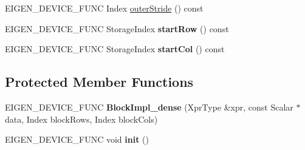 \begin{DoxyCompactItemize}
\item 
E\+I\+G\+E\+N\+\_\+\+D\+E\+V\+I\+C\+E\+\_\+\+F\+U\+NC Index \mbox{\hyperlink{class_eigen_1_1internal_1_1_block_impl__dense_3_01_xpr_type_00_01_block_rows_00_01_block_cols_00_01_inner_panel_00_01true_01_4_ac6f37b9a06897f0891fcd7b65ce2800e}{outer\+Stride}} () const
\item 
\mbox{\label{class_eigen_1_1internal_1_1_block_impl__dense_3_01_xpr_type_00_01_block_rows_00_01_block_cols_00_01_inner_panel_00_01true_01_4_acba1ac3133130df90650b256338b64df}} 
E\+I\+G\+E\+N\+\_\+\+D\+E\+V\+I\+C\+E\+\_\+\+F\+U\+NC Storage\+Index {\bfseries start\+Row} () const
\item 
\mbox{\label{class_eigen_1_1internal_1_1_block_impl__dense_3_01_xpr_type_00_01_block_rows_00_01_block_cols_00_01_inner_panel_00_01true_01_4_aad398a270fefb4092098de434d1d48d0}} 
E\+I\+G\+E\+N\+\_\+\+D\+E\+V\+I\+C\+E\+\_\+\+F\+U\+NC Storage\+Index {\bfseries start\+Col} () const
\end{DoxyCompactItemize}
\subsection*{Protected Member Functions}
\begin{DoxyCompactItemize}
\item 
\mbox{\label{class_eigen_1_1internal_1_1_block_impl__dense_3_01_xpr_type_00_01_block_rows_00_01_block_cols_00_01_inner_panel_00_01true_01_4_a76cc797c9cfccc1af4cf13107d271863}} 
E\+I\+G\+E\+N\+\_\+\+D\+E\+V\+I\+C\+E\+\_\+\+F\+U\+NC {\bfseries Block\+Impl\+\_\+dense} (Xpr\+Type \&xpr, const Scalar $\ast$data, Index block\+Rows, Index block\+Cols)
\item 
\mbox{\label{class_eigen_1_1internal_1_1_block_impl__dense_3_01_xpr_type_00_01_block_rows_00_01_block_cols_00_01_inner_panel_00_01true_01_4_a2930e1284a7cd0d10ca7af46c50520e2}} 
E\+I\+G\+E\+N\+\_\+\+D\+E\+V\+I\+C\+E\+\_\+\+F\+U\+NC void {\bfseries init} ()
\end{DoxyCompactItemize}
